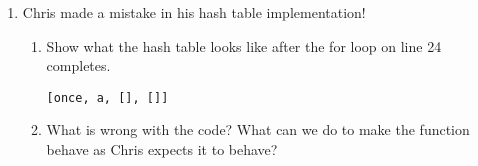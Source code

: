 \documentclass[11pt]{article}
\newenvironment{answer}{\large\lstset{basicstyle=\tiny\ttfamily}\color{white}}{}
\newenvironment{answer}{\large\lstset{basicstyle=\large\ttfamily}\color{red}}{}
\begin{document}
\begin{enumerate}
\begin{enumerate}
\item Write the following methods to create a queue in similar fashion to previous question (with a Python list as the data structure managing elements "under the hood"):
	\begin{itemize}
	\item []\texttt{enqueue(lst)}
	\item []\texttt{dequeue(lst)}
	\end{itemize}

	\begin{answer}
	 \begin{lstlisting}
	def enqueue(lst, val):
		lst.append(val)
	def dequeue(lst):
		list.pop(0)
	\end{lstlisting}
	\end{answer}

\item Which of the data structures you implemented is more efficient and why? Give a better way to implement the slower structure, and discuss how this would change the time complexity of its operations. \\
\begin{answer}
Because the queue must be able to modify both ends of the list, it pays an O(n) cost to remove the beginning element during each dequeue operation. This could be reduced to O(1) by using a linked list instead of a Python list.
\end{answer}
\end{enumerate}

\pagebreak
\section*{Hashing and Hash Tables}

\item Chris made a mistake in his hash table implementation!

    
    \begin{enumerate}
    \item Show what the hash table looks like after the for loop on line 24
          completes. 

        \begin{answer}
		\begin{lstlisting}[numbers=none]
[once, a, [], []]
		\end{lstlisting}

        \end{answer}

    \item What is wrong with the code? What can we do to make the function behave as Chris expects it to behave?


\end{enumerate}
\end{enumerate}
\end{document}
